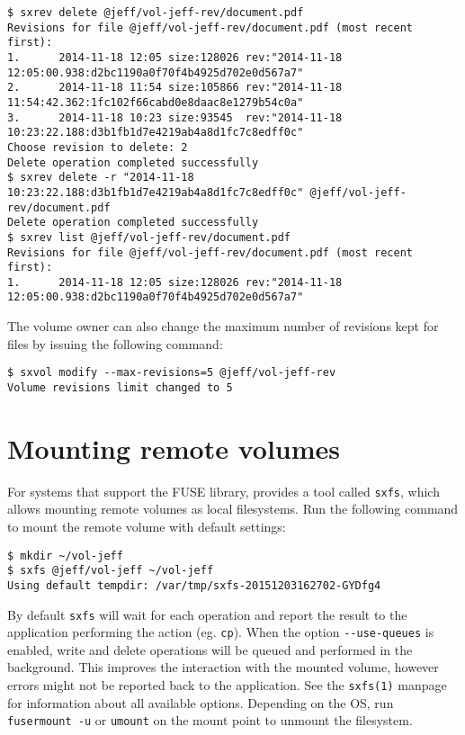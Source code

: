 \begin{lstlisting}
$ sxrev delete @jeff/vol-jeff-rev/document.pdf
Revisions for file @jeff/vol-jeff-rev/document.pdf (most recent first):
1.      2014-11-18 12:05 size:128026 rev:"2014-11-18 12:05:00.938:d2bc1190a0f70f4b4925d702e0d567a7"
2.      2014-11-18 11:54 size:105866 rev:"2014-11-18 11:54:42.362:1fc102f66cabd0e8daac8e1279b54c0a"
3.      2014-11-18 10:23 size:93545  rev:"2014-11-18 10:23:22.188:d3b1fb1d7e4219ab4a8d1fc7c8edff0c"
Choose revision to delete: 2
Delete operation completed successfully
$ sxrev delete -r "2014-11-18 10:23:22.188:d3b1fb1d7e4219ab4a8d1fc7c8edff0c" @jeff/vol-jeff-rev/document.pdf
Delete operation completed successfully
$ sxrev list @jeff/vol-jeff-rev/document.pdf
Revisions for file @jeff/vol-jeff-rev/document.pdf (most recent first):
1.      2014-11-18 12:05 size:128026 rev:"2014-11-18 12:05:00.938:d2bc1190a0f70f4b4925d702e0d567a7"
\end{lstlisting}
The volume owner can also change the maximum number of revisions kept for files
by issuing the following command:
\begin{lstlisting}
$ sxvol modify --max-revisions=5 @jeff/vol-jeff-rev
Volume revisions limit changed to 5
\end{lstlisting}

\section{Mounting remote volumes}
For systems that support the FUSE library, \SX provides a tool called
\verb+sxfs+, which allows mounting remote volumes as local filesystems.
Run the following command to mount the remote volume with default settings:
\begin{lstlisting}
$ mkdir ~/vol-jeff
$ sxfs @jeff/vol-jeff ~/vol-jeff
Using default tempdir: /var/tmp/sxfs-20151203162702-GYDfg4
\end{lstlisting}
By default \verb+sxfs+ will wait for each operation and report the result
to the application performing the action (eg. \verb+cp+). When the option
\verb+--use-queues+ is enabled, write and delete operations will be queued
and performed in the background. This improves the interaction with the
mounted volume, however errors might not be reported back to the application.
See the \verb+sxfs(1)+ manpage for information about all available options.
Depending on the OS, run \verb+fusermount -u+ or \verb+umount+ on the mount
point to unmount the filesystem.
